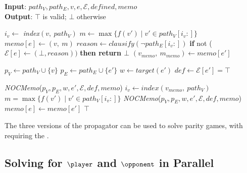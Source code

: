 \documentclass[runningheads]{llncs}
\begin{document}
\begin{algorithm}[htb]
\caption{\textbf{\textit{NOCMemo}}}
\small
\textbf{Input}: $path_V, path_E, v, e, \mathcal{E}, \textit{defined}, \textit{memo}$ \\
\textbf{Output}: $\top$ is valid; $\bot$ otherwise
\begin{algorithmic}[1]
        \STATE $i_v \gets$ \textit{index}$(v,\ path_V)$
        \STATE $m \gets \max\{f(v') \mid v' \in path_V[i_v:]\}$
        \STATE $\textit{memo}[e] \gets (v,\ m)$ \label{alg:noc-memo:update}
            \STATE $\textit{reason} \gets \textit{clausify}(\neg path_E[i_v:])$
            \STATE \textbf{if }not ($\mathcal{E}[e] \gets (\bot, \textit{reason}))$ \textbf{then return $\bot$}
        \ENDIF
            \STATE $(v_{memo},\ m_{memo}) \gets \textit{memo}[e']$

            \STATE $p_V \gets path_V \cup \{v\}$
            \STATE $p_E \gets path_E \cup \{e'\}$
            \STATE $w \gets \textit{target}(e')$
            \STATE $\textit{def} \gets \mathcal{E}[e'] = \top$

                \STATE \textit{NOCMemo}($p_V, p_E, w, e', \mathcal{E}, def , \textit{memo}$)\label{alg:noc-memo:check1}
            \ELSE
                \STATE $i_v \gets \textit{index}(v_{memo},\ path_V)$
                \STATE $m = \max\{f(v') \mid v' \in path_V[i_v:]\}$
                    \STATE \textit{NOCMemo}($p_V, p_E, w, e', \mathcal{E}, def , \textit{memo}$)\label{alg:noc-memo:check2}
                \ELSE
                    \STATE $\textit{memo}[e] \gets \textit{memo}[e']$
                \ENDIF
            \ENDIF
        \ENDFOR
    \ENDIF
    \RETURN $\top$
\end{algorithmic}
\label{alg:noc-memo}
\end{algorithm}

The three versions of the \noc propagator can be used to solve parity games, with \nocmemo requiring the \nocchecker.

\subsection{Solving for $\player$ and $\opponent$ in Parallel}
\end{document}

